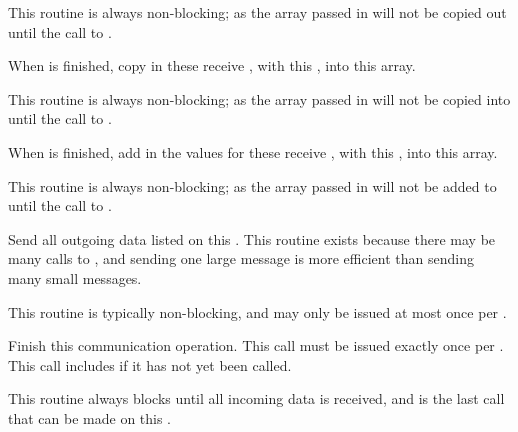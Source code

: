 This routine is always non-blocking; as the  array passed in
will not be copied out until the call to .



When  is finished, copy in these receive , with
this , into this  array.

This routine is always non-blocking; as the  array passed in
will not be copied into until the call to .



When  is finished, add in the values for these receive , 
with this , into this  array.

This routine is always non-blocking; as the  array passed in
will not be added to until the call to .



Send all outgoing data listed on this .  This routine exists because there may be many calls to , and sending one large message is more efficient than sending many small messages.

This routine is typically non-blocking, and may only be issued at most once per .



Finish this communication operation. This call must be issued exactly once per .  This call includes  if it has not yet been called.

This routine always blocks until all incoming data is received, and is the last call that can be made on this .

